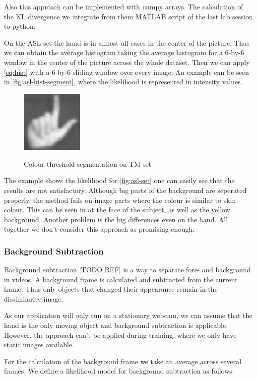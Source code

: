 \documentclass[letterpaper, 10 pt, conference]{ieeeconf}  %
\begin{document}
Also this approach can be implemented with numpy arrays. The calculation of the KL divergence we integrate from them MATLAB script of the last lab session to python.

On the ASL-set the hand is in almost all cases in the center of the picture. Thus we can obtain the average histogram taking the average histogram for a 6-by-6 window in the center of the picture across the whole dataset. Then we can apply \autoref{eq:hist} with a 6-by-6 sliding window over every image. An example can be seen in \autoref{fig:asl-hist-segment}, where the likelihood is represented in intensity values.

\begin{figure}
\centering
\includegraphics[height=3cm]{tm-segment}
\label{fig:tm-segment}
\caption{Colour-threshold segmentation on TM-set}
\end{figure}

The example shows the likelihood for \autoref{fig:asl-set} one can easily see that the results are not satisfactory. Although big parts of the background are seperated properly, the method fails on image parts where the colour is similar to skin colour. This can be seen in at the face of the subject, as well as the yellow background. Another problem is the big differences even on the hand. All together we don't consider this approach as promising enough.

\subsubsection{Background Subtraction}

Background subtraction [TODO REF] is a way to separate fore- and background in videos. A background frame is calculated and subtracted from the current frame. Thus only objects that changed their appearance remain in the dissimilarity image.

As our application will only run on a stationary webcam, we can assume that the hand is the only moving object and background subtraction is applicable. However, the approach can't be applied during training, where we only have static images available.

For the calculation of the background frame we take an average across several frames. We define a likelihood model for background subtraction as follows:
\end{document}
